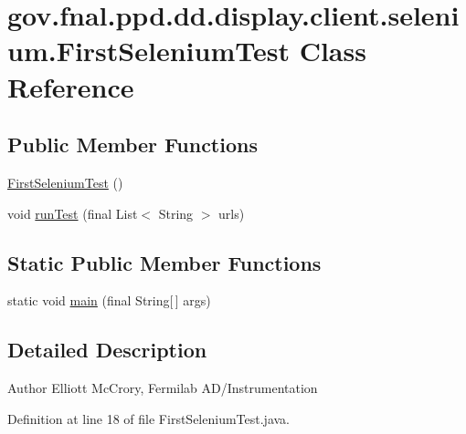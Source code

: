 \hypertarget{classgov_1_1fnal_1_1ppd_1_1dd_1_1display_1_1client_1_1selenium_1_1FirstSeleniumTest}{\section{gov.\-fnal.\-ppd.\-dd.\-display.\-client.\-selenium.\-First\-Selenium\-Test Class Reference}
\label{classgov_1_1fnal_1_1ppd_1_1dd_1_1display_1_1client_1_1selenium_1_1FirstSeleniumTest}
}
\subsection*{Public Member Functions}
\begin{DoxyCompactItemize}
\item 
\hyperlink{classgov_1_1fnal_1_1ppd_1_1dd_1_1display_1_1client_1_1selenium_1_1FirstSeleniumTest_ab757d31d6ef1da3054ac563844ded8a7}{First\-Selenium\-Test} ()
\item 
void \hyperlink{classgov_1_1fnal_1_1ppd_1_1dd_1_1display_1_1client_1_1selenium_1_1FirstSeleniumTest_a2d2a0e6d397cb83c11e764529ea355e5}{run\-Test} (final List$<$ String $>$ urls)
\end{DoxyCompactItemize}
\subsection*{Static Public Member Functions}
\begin{DoxyCompactItemize}
\item 
static void \hyperlink{classgov_1_1fnal_1_1ppd_1_1dd_1_1display_1_1client_1_1selenium_1_1FirstSeleniumTest_a3d9afcec8509f5fdc5c7b837dc86337b}{main} (final String\mbox{[}$\,$\mbox{]} args)
\end{DoxyCompactItemize}


\subsection{Detailed Description}
\begin{DoxyAuthor}{Author}
Elliott Mc\-Crory, Fermilab A\-D/\-Instrumentation 
\end{DoxyAuthor}


Definition at line 18 of file First\-Selenium\-Test.\-java.



